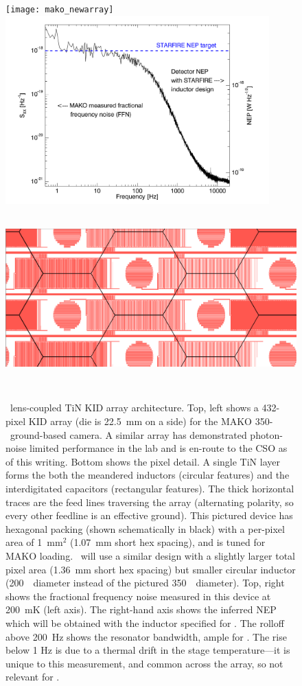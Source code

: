 \begin{figure}[t!]
\begin{center}
\texttt{[image: mako\_newarray]}
\includegraphics*[height=7.25cm,trim=1cm 0.2cm 1cm 0.5cm]{icaris_nep}
\includegraphics*[height=7cm,trim= 9cm 5.5cm 16cm 8.2cm]{mako_new_ledit}\\
\captionbaseline\caption{\small  \icaris\ lens-coupled TiN KID array architecture.   Top, left shows a 432-pixel KID array (die is 22.5~mm on a side) for the MAKO 350-\mum\ ground-based camera.  A similar array has demonstrated photon-noise limited performance in the lab and is en-route to the CSO as of this writing.  Bottom shows the pixel detail.  A single TiN layer forms the both the meandered inductors (circular features) and the interdigitated capacitors (rectangular features).  The thick horizontal traces are the feed lines traversing the array (alternating polarity, so every other feedline is an effective ground).  This pictured device has hexagonal packing (shown schematically in black) with a per-pixel area of 1~mm$^2$ (1.07~mm short hex spacing), and is tuned for MAKO loading.  \icaris\ will use a similar design with a slightly larger total pixel area (1.36~mm short hex spacing) but smaller circular inductor (200~\mum\ diameter instead of the pictured 350~\mum\ diameter).  Top, right shows the fractional frequency noise measured in this device at 200~mK (left axis).  The right-hand axis shows the inferred NEP which will be obtained with the inductor specified for \icaris.  The rolloff above 200~Hz shows the resonator bandwidth, ample for \icaris. The rise below 1 Hz is due to a thermal drift in the stage temperature---it is unique to this measurement, and common across the array, so not relevant for \icaris. }

\end{center}
\end{figure}

